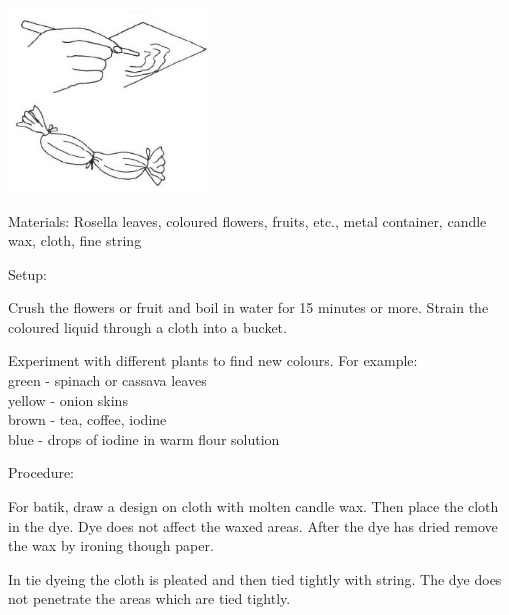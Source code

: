 \begin{multicols}{2}
\begin{center}
\includegraphics[width=0.4\textwidth]{./img/vso/tie-dyeing.png}
\end{center}

\begin{description*}
\item[Materials:]{Rosella leaves, coloured flowers, fruits, etc., metal container, candle wax, cloth, fine string}
\item[Setup:]{Crush the flowers or fruit and boil in water for 15 minutes or more. Strain the coloured liquid through a cloth into a bucket.

Experiment with different plants to find new colours. For example:\\
green - spinach or cassava leaves\\
yellow - onion skins\\
brown - tea, coffee, iodine\\
blue - drops of iodine in warm flour solution}
\item[Procedure:]{For batik, draw a design on cloth with molten candle wax. Then place the cloth in the dye. Dye does not affect the waxed areas. After the dye has dried remove the wax by ironing though paper.

In tie dyeing the cloth is pleated and then tied tightly with string. The dye does not penetrate the areas which are tied tightly.}
\end{description*}



\end{multicols}

\pagebreak